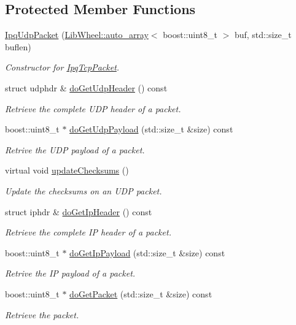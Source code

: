 \subsection*{\-Protected \-Member \-Functions}
\begin{DoxyCompactItemize}
\item 
\hyperlink{classIPQ_1_1IpqUdpPacket_a2838137c87223b21b25be77950bc2d6e}{\-Ipq\-Udp\-Packet} (\hyperlink{classLibWheel_1_1auto__array}{\-Lib\-Wheel\-::auto\-\_\-array}$<$ boost\-::uint8\-\_\-t $>$ buf, std\-::size\-\_\-t buflen)
\begin{DoxyCompactList}\small\item\em \-Constructor for \hyperlink{classIPQ_1_1IpqTcpPacket}{\-Ipq\-Tcp\-Packet}. \end{DoxyCompactList}\item 
struct udphdr \& \hyperlink{classIPQ_1_1IpqUdpPacket_a0b0b2c8eb553e313cb439ef2ea13762d}{do\-Get\-Udp\-Header} () const 
\begin{DoxyCompactList}\small\item\em \-Retrieve the complete \-U\-D\-P header of a packet. \end{DoxyCompactList}\item 
boost\-::uint8\-\_\-t $\ast$ \hyperlink{classIPQ_1_1IpqUdpPacket_a1e789c47ce3f43b715969987edc6d06d}{do\-Get\-Udp\-Payload} (std\-::size\-\_\-t \&size) const 
\begin{DoxyCompactList}\small\item\em \-Retrive the \-U\-D\-P payload of a packet. \end{DoxyCompactList}\item 
virtual void \hyperlink{classIPQ_1_1IpqUdpPacket_abc390e2f22ffbd3d6d9a2df228cb71d6}{update\-Checksums} ()
\begin{DoxyCompactList}\small\item\em \-Update the checksums on an \-U\-D\-P packet. \end{DoxyCompactList}\item 
struct iphdr \& \hyperlink{classIPQ_1_1IpqIpPacket_a6be0afa1f616cbe7722ef817a65e24dc}{do\-Get\-Ip\-Header} () const 
\begin{DoxyCompactList}\small\item\em \-Retrieve the complete \-I\-P header of a packet. \end{DoxyCompactList}\item 
boost\-::uint8\-\_\-t $\ast$ \hyperlink{classIPQ_1_1IpqIpPacket_ab78709e0712a1912d19114f815407303}{do\-Get\-Ip\-Payload} (std\-::size\-\_\-t \&size) const 
\begin{DoxyCompactList}\small\item\em \-Retrive the \-I\-P payload of a packet. \end{DoxyCompactList}\item 
boost\-::uint8\-\_\-t $\ast$ \hyperlink{classIPQ_1_1IpqPacket_a7b8f489a9cec36058eaee43f6566a999}{do\-Get\-Packet} (std\-::size\-\_\-t \&size) const 
\begin{DoxyCompactList}\small\item\em \-Retrieve the packet. \end{DoxyCompactList}\end{DoxyCompactItemize}
